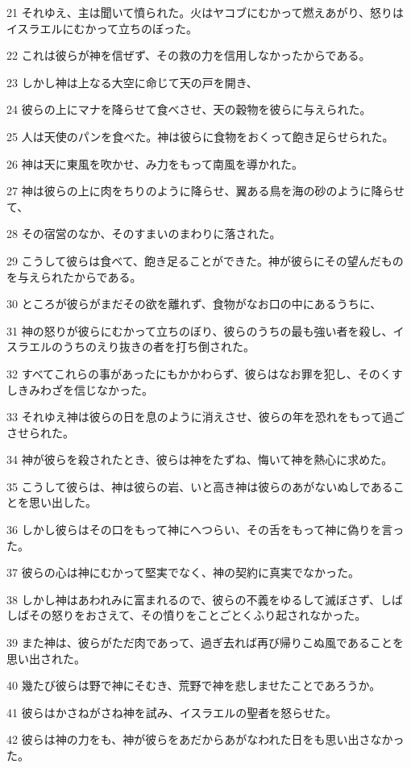 \par 21 それゆえ、主は聞いて憤られた。火はヤコブにむかって燃えあがり、怒りはイスラエルにむかって立ちのぼった。
\par 22 これは彼らが神を信ぜず、その救の力を信用しなかったからである。
\par 23 しかし神は上なる大空に命じて天の戸を開き、
\par 24 彼らの上にマナを降らせて食べさせ、天の穀物を彼らに与えられた。
\par 25 人は天使のパンを食べた。神は彼らに食物をおくって飽き足らせられた。
\par 26 神は天に東風を吹かせ、み力をもって南風を導かれた。
\par 27 神は彼らの上に肉をちりのように降らせ、翼ある鳥を海の砂のように降らせて、
\par 28 その宿営のなか、そのすまいのまわりに落された。
\par 29 こうして彼らは食べて、飽き足ることができた。神が彼らにその望んだものを与えられたからである。
\par 30 ところが彼らがまだその欲を離れず、食物がなお口の中にあるうちに、
\par 31 神の怒りが彼らにむかって立ちのぼり、彼らのうちの最も強い者を殺し、イスラエルのうちのえり抜きの者を打ち倒された。
\par 32 すべてこれらの事があったにもかかわらず、彼らはなお罪を犯し、そのくすしきみわざを信じなかった。
\par 33 それゆえ神は彼らの日を息のように消えさせ、彼らの年を恐れをもって過ごさせられた。
\par 34 神が彼らを殺されたとき、彼らは神をたずね、悔いて神を熱心に求めた。
\par 35 こうして彼らは、神は彼らの岩、いと高き神は彼らのあがないぬしであることを思い出した。
\par 36 しかし彼らはその口をもって神にへつらい、その舌をもって神に偽りを言った。
\par 37 彼らの心は神にむかって堅実でなく、神の契約に真実でなかった。
\par 38 しかし神はあわれみに富まれるので、彼らの不義をゆるして滅ぼさず、しばしばその怒りをおさえて、その憤りをことごとくふり起されなかった。
\par 39 また神は、彼らがただ肉であって、過ぎ去れば再び帰りこぬ風であることを思い出された。
\par 40 幾たび彼らは野で神にそむき、荒野で神を悲しませたことであろうか。
\par 41 彼らはかさねがさね神を試み、イスラエルの聖者を怒らせた。
\par 42 彼らは神の力をも、神が彼らをあだからあがなわれた日をも思い出さなかった。
